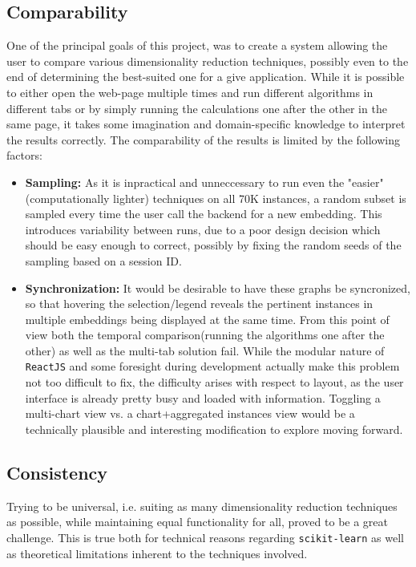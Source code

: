 \documentclass[11pt,a4paper]{article}
\begin{document}
    \subsection*{Comparability}
        One of the principal goals of this project, was to create a system allowing the user to compare various dimensionality reduction techniques, possibly even to the end of determining the best-suited one for a give application. While it is possible to either open the web-page multiple times and run different algorithms in different tabs or by simply running the calculations one after the other in the same page, it takes some imagination and domain-specific knowledge to interpret the results correctly. The comparability of the results is limited by the following factors:
        \begin{itemize} 
            \item \textbf{Sampling:} As it is inpractical and unneccessary to run even the "easier"(computationally lighter) techniques on all 70K instances, a random subset is sampled every time the user call the backend for a new embedding. This introduces variability between runs, due to a poor design decision which should be easy enough to correct, possibly by fixing the random seeds of the sampling based on a session ID.
            \item \textbf{Synchronization:} It would be desirable to have these graphs be syncronized, so that hovering the selection/legend reveals the pertinent instances in multiple embeddings being displayed at the same time. From this point of view both the temporal comparison(running the algorithms one after the other) as well as the multi-tab solution fail. While the modular nature of \texttt{ReactJS} and some foresight during development actually make this problem not too difficult to fix, the difficulty arises with respect to layout, as the user interface is already pretty busy and loaded with information. Toggling a multi-chart view vs. a chart+aggregated instances view would be a technically plausible and interesting modification to explore moving forward. 
        \end{itemize} 
    
    \subsection*{Consistency}
        Trying to be universal, i.e. suiting as many dimensionality reduction techniques as possible, while maintaining equal functionality for all, proved to be a great challenge. This is true both for technical reasons regarding \texttt{scikit-learn} as well as theoretical limitations inherent to the techniques involved.
\end{document}
